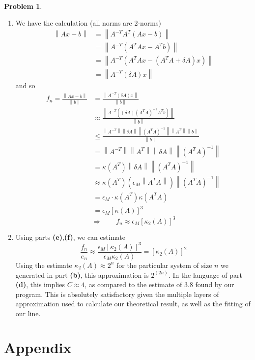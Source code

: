 \documentclass[12pt]{article}
\theoremstyle{definition}
\newtheorem{prob}{Problem}
\newcommand{\norm}[1]{\left\lVert#1\right\rVert}
\begin{document}
\begin{prob}
\begin{enumerate}[\bfseries(a)]
    \item We have the calculation (all norms are 2-norms)
        \begin{align*}
            \norm{Ax-b} &= \norm{A^{-T}A^{T}\left(Ax - b\right)} \\
                        &= \norm{A^{-T}\left(A^TAx - A^Tb\right)} \\
                        &= \norm{A^{-T}\left(A^TAx - \left(A^TA + \delta A\right)x\right)} \\
                        &= \norm{A^{-T}\left(\delta A\right)x}
            \end{align*}
            and so
            \begin{align*}
                f_n = \frac{\norm{Ax-b}}{\norm{b}}
                &= \frac{\norm{A^{-T}\left(\delta A\right)x}}{\norm{b}} \\
                &\approx \frac{\norm{A^{-T}\left( \left(\delta A\right)
                    \left(A^TA\right)^{-1}A^Tb\right)}}{\norm{b}} \\
                    &\leq \frac{\norm{A^{-T}} \norm{\delta A} \norm{\left(A^TA\right)^{-1}} \norm{A^T}
                \norm{b}}{\norm{b}} \\
                &= \norm{A^{-T}}\norm{A^T} \norm{\delta A} \norm{\left(A^TA\right)^{-1}}  \\
                &= \kappa(A^T) \norm{\delta A} \norm{\left(A^TA\right)^{-1}} \\
                &\approx \kappa(A^T) \left(\epsilon_M \norm{A^TA}\right)\norm{\left(A^TA\right)^{-1}} \\
                &= \epsilon_M \cdot \kappa\left(A^T\right) \kappa\left(A^TA\right) \\
                &= \epsilon_M \left[\kappa(A)\right]^3
            \end{align*}
    \[
            \Longrightarrow \qquad \boxed{f_n \approx \epsilon_M \left[\kappa_2 (A) \right]^3}
        \]
    \item
        Using parts \textbf{(e)},\textbf{(f)}, we can estimate
        \[
    \frac{f_n}{ e_n} \approx \frac{\epsilon_M \left[\kappa_2 (A) \right]^3}{\epsilon_M \kappa_2(A)}
        = \left[\kappa_2(A)\right]^2
    \]
    Using the estimate $\kappa_2(A) \approx 2^n$ for the particular system of size $n$ we generated in part
    \textbf{(b)}, this approximation is $2^{(2n)}$.
    In the language of part \textbf{(d)}, this implies $C\approx 4$, as compared to the estimate of $3.8$ found by our program. This is absolutely satisfactory given the multiple layers of approximation used to calculate our theoretical result, as well as the fitting of our line.
\end{enumerate}
\end{prob}
\hrulefill %
\newpage



\section{Appendix}


\clearpage

\end{document}
